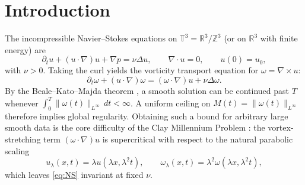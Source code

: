 \documentclass[11pt,a4paper]{article}
\theoremstyle{plain}
\theoremstyle{definition}
\theoremstyle{remark}
\newcommand{\T}{\mathbb{T}^3}
\newcommand{\R}{\mathbb{R}}
\begin{document}
\tableofcontents

\section{Introduction}\label{sec:intro}

The incompressible Navier--Stokes equations on $\T=\R^3/\mathbb{Z}^3$ (or on $\R^3$ with finite energy) are
\begin{equation}\label{eq:NS}
\partial_t u+(u\cdot\nabla)u+\nabla p=\nu\Delta u,\qquad \nabla\cdot u=0,\qquad u(0)=u_0,
\end{equation}
with $\nu>0$. Taking the curl yields the vorticity transport equation for $\omega=\nabla\times u$:
\begin{equation}\label{eq:vort}
\partial_t\omega+(u\cdot\nabla)\omega=(\omega\cdot\nabla)u+\nu\Delta\omega .
\end{equation}
By the Beale--Kato--Majda theorem \cite{BKM1984}, a smooth solution can be continued past $T$ whenever $\int_0^T\|\omega(t)\|_{L^\infty}\,dt<\infty$. A uniform ceiling on $M(t)=\|\omega(t)\|_{L^\infty}$ therefore implies global regularity. Obtaining such a bound for arbitrary large smooth data is the core difficulty of the Clay Millennium Problem \cite{Fefferman2006}: the vortex-stretching term $(\omega\cdot\nabla)u$ is supercritical with respect to the natural parabolic scaling
\begin{equation}\label{eq:scaling}
u_\lambda(x,t)=\lambda u(\lambda x,\lambda^2t),\qquad \omega_\lambda(x,t)=\lambda^2\omega(\lambda x,\lambda^2 t),
\end{equation}
which leaves \eqref{eq:NS} invariant at fixed $\nu$.
\end{document}
